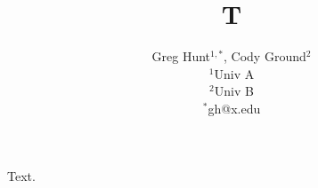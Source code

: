 \documentclass{amsart}
\begin{document}
\title{T}
\author{Greg Hunt$^{1,*}$, Cody Ground$^{2}$\\ $^{1}$Univ A\\ $^{2}$Univ B\\ $^{*}$gh@x.edu}
\maketitle
Text.
\end{document}
